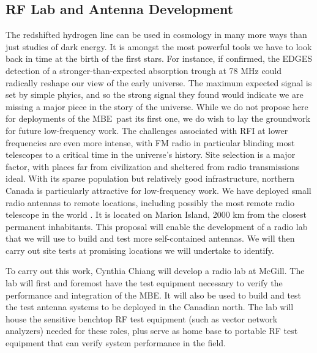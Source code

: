 \documentclass[letterpaper,11pt,preprint]{aastex}
\newcommand{\mbe}{{\rm MBE}}
\begin{document}
\subsection{RF Lab and Antenna Development}
The redshifted hydrogen line can be used in cosmology in many more
ways than just studies of dark energy.  It is amongst the most
powerful tools we have to look back in time at the birth of the first
stars.  For instance, if confirmed, the EDGES detection of a
stronger-than-expected absorption trough at 78 MHz \citep{Bowman2018}
could radically reshape our view of the early universe.  The maximum
expected signal is set by simple phyics, and so the strong signal they
found would indicate we are missing a major piece in the story of the
universe.  While we do not propose here for deployments of the
\mbe\ past its first one, we do wish to lay the groundwork for future
low-frequency work.  The challenges associated with RFI at lower
frequencies are even more intense, with FM radio in particular
blinding most telescopes to a critical time in the universe's history.
Site selection is a major factor, with places far from civilization
and sheltered from radio transmissions ideal.  With its sparse
population but relatively good infrastructure, northern Canada is
particularly attractive for low-frequency work.  We have deployed
small radio antennas to remote locations, including possibly the most
remote radio telescope in the world \citep{PRIZM}.  It is located on
Marion Island, 2000 km from the closest permanent inhabitants.  This
proposal will enable the development of a radio lab that we will use
to build and test more self-contained antennas.  We will then carry
out site tests at promising locations we will undertake to identify.  

To carry out this work, Cynthia Chiang will develop a radio lab at
McGill.  The lab will first and foremost have the test equipment
necessary to verify the performance and integration of the \mbe.  It
will also be used to build and test the test antenna systems to be
deployed in the Canadian north.  The lab will house the sensitive
benchtop RF test equipment (such as vector network analyzers) needed
for these roles, plus serve as home base to portable RF test equipment
that can verify system performance in the field.  
\end{document}
